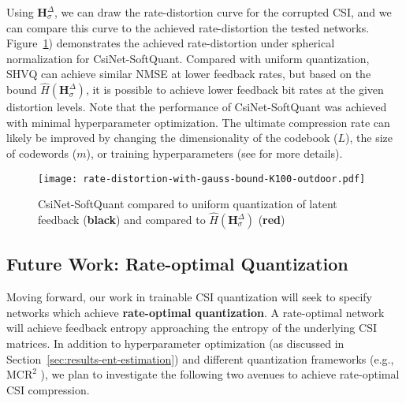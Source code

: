 Using $\mathbf H_\sigma^\Delta$, we can draw the rate-distortion curve for the corrupted CSI, and we can compare this curve to the achieved rate-distortion the tested networks. Figure~\ref{fig:csinet-soft-bound}) demonstrates the achieved rate-distortion under spherical normalization for CsiNet-SoftQuant. Compared with uniform quantization, SHVQ can achieve similar NMSE at lower feedback rates, but based on the bound $\hat H(\mathbf H_\sigma^\Delta)$, it is possible to achieve lower feedback bit rates at the given distortion levels. Note that the performance of CsiNet-SoftQuant was achieved with minimal hyperparameter optimization. The ultimate compression rate can likely be improved by changing the dimensionality of the codebook ($L$), the size of codewords ($m$), or training hyperparameters (see \cite{ref:Agustsson2017SoftToHard} for more details).  
\begin{figure}[!hbtp] \centering 
	\centering
	\texttt{[image: rate-distortion-with-gauss-bound-K100-outdoor.pdf]}
	\caption{CsiNet-SoftQuant compared to uniform quantization of latent feedback (\textbf{black}) and compared to $\hat H(\mathbf H_\sigma^\Delta)$ (\textbf{{\color{red}red}})} 
	\label{fig:csinet-soft-bound} 
\end{figure}

\subsection{Future Work: Rate-optimal Quantization}

Moving forward, our work in trainable CSI quantization will seek to specify networks which achieve \textbf{rate-optimal quantization}. A rate-optimal network will achieve feedback entropy approaching the entropy of the underlying CSI matrices. In addition to hyperparameter optimization (as discussed in Section~\ref{sec:results-ent-estimation}) and different quantization frameworks (e.g., $\text{MCR}^2$ \cite{ref:Yu2020MCR2}), we plan to investigate the following two avenues to achieve rate-optimal CSI compression.

